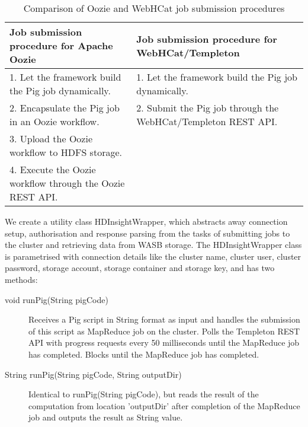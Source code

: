\begin{table}
\centering
\begin{tabular}{p{5cm}p{5cm}}\toprule
Job submission procedure for Apache Oozie & Job submission procedure for WebHCat/Templeton \\
\midrule
1. Let the framework build the Pig job dynamically. & 1. Let the framework build the Pig job dynamically.\\
2. Encapsulate the Pig job in an Oozie workflow. & 2. Submit the Pig job through the WebHCat/Templeton REST API.\\
3. Upload the Oozie workflow to HDFS storage. & \\
4. Execute the Oozie workflow through the Oozie REST API. & \\
\bottomrule
\end{tabular}
\caption{Comparison of Oozie and WebHCat job submission procedures}
\label{tbl:oozie_templeton}
\end{table}

We create a utility class HDInsightWrapper, which abstracts away connection setup, authorisation and response parsing from the tasks of submitting jobs to the cluster and retrieving data from \ac{WASB} storage. The HDInsightWrapper class is parametrised with connection details like the cluster name, cluster user, cluster password, storage account, storage container and storage key, and has two methods:

\begin{description}
\item[void runPig(String pigCode)]{Receives a Pig script in String format as input and handles the submission of this script as MapReduce job on the cluster. Polls the Templeton REST API with progress requests every 50 milliseconds until the MapReduce job has completed. Blocks until the MapReduce job has completed.}
\item[String runPig(String pigCode, String outputDir)]{Identical to runPig(String pigCode), but reads the result of the computation from location 'outputDir' after completion of the MapReduce job and outputs the result as String value.}
\end{description}


